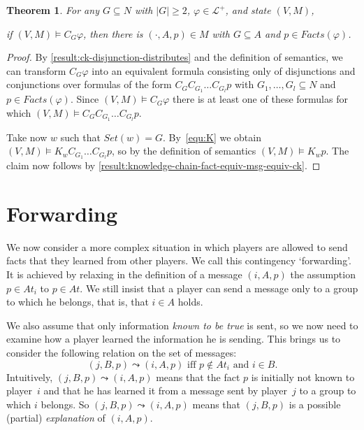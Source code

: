 \documentclass{article}
\newcommand{\abs}[1]{\lvert#1\rvert}
\newcounter{#1}
\newtheorem{theorem}{Theorem}[section]
\newcommand{\state}[1][]{\ensuremath{(V#1,M#1)}\xspace}
\newcommand{\setof}[1]{\ensuremath{\mathit{Set}(#1)}\xspace}
\newcommand{\msg}[3]{\ensuremath{(#1,#2,#3)}\xspace}
\newcommand{\bits}{\ensuremath{At}\xspace}
\newcommand{\knows}[1]{\ensuremath{K_{#1}}\xspace}
\newcommand{\ck}[1]{\ensuremath{C_{#1}}\xspace}\newcommand{\Facts}{\mathit{Facts}}
\begin{document}
\begin{theorem}
  \label{result:knowledge-chain-phi-only-through-msg}
  \label{thm:pos}
  For any $G\subseteq N$ with $\abs G\geq2$, $\varphi\in\mathcal{L}^+$, and state \state,
  \begin{center}
    if $\state\vDash \ck G\varphi$, then there is $\msg{\cdot}{A}{p}\in M$ with $G\subseteq A$ and $p \in Facts(\varphi)$.
\end{center}
\end{theorem}
\begin{proof}
  By \cref{result:ck-disjunction-distributes} and the definition of semantics,
  we can transform $\ck G\varphi$ into an equivalent formula
  consisting only of disjunctions and conjunctions over formulas of the form $\ck G\ck{G_1}\dots \ck{G_l}p$
  with $G_1,\dots,G_l\subseteq N$ and $p\in Facts(\varphi)$.
  Since $\state\vDash \ck G\varphi$ there is at least one of these formulas for which
  $\state\models \ck G\ck{G_1}\dots \ck{G_l}p$. 

  Take now $w$ such that $\setof w = G$.
  By~\eqref{equ:K} we obtain $\state\vDash \knows w \ck{G_1}\dots \ck{G_l} p$, so
by the definition of semantics $\state\vDash \knows w p$.
  The claim now follows by \cref{result:knowledge-chain-fact-equiv-msg-equiv-ck}.
\end{proof}


\section{Forwarding}
\label{sec:forwarding}

We now consider a more complex situation in which players are allowed
to send facts that they learned from other players.
We call this contingency `forwarding'.
It is achieved by
relaxing in the definition of a message $(i,A,p)$ the assumption 
$p \in \bits_i$ to $p \in \bits$.
We still insist that a player can send a message only to a group to which he belongs,
that is, that $i \in A$ holds. 

We also assume that only information \emph{known to be true} is sent,
so we now need to examine how a player learned the information he is sending.
This brings us to consider the following relation on the set of messages:
\[
\mbox{$(j,B,p) \leadsto (i,A,p)$ iff $p \not\in \bits_i$ and $i \in B$.}
\]
Intuitively, $(j,B,p) \leadsto (i,A,p)$ means that the fact $p$ is initially not known to player~$i$ 
and that he has learned it from a message sent by player~$j$ to a group to which $i$ belongs.
So $(j,B,p) \leadsto (i,A,p)$ means that $(j,B,p)$ is a possible (partial) \emph{explanation} of $(i,A,p)$.
\end{document}
